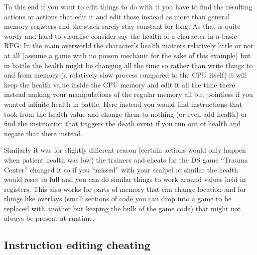 \documentclass[
]{book}
\begin{document}
To this end if you want to edit things to do with it you have to find the resulting actions or actions that edit it and edit those instead as more than general memory registers and the stack rarely stay constant for long. As that is quite wordy and hard to visualise consider say the health of a character in a basic RPG: In the main overworld the character's health matters relatively little or not at all (assume a game with no poison mechanic for the sake of this example) but in battle the health might be changing all the time so rather than write things to and from memory (a relatively slow process compared to the CPU itself) it will keep the health value inside the CPU memory and edit it all the time there instead making your manipulations of the regular memory all but pointless if you wanted infinite health in battle. Here instead you would find instructions that took from the health value and change them to nothing (or even add health) or find the instruction that triggers the death event if you run out of health and negate that there instead.

Similarly it was for slightly different reason (certain actions would only happen when patient health was low) the trainers and cheats for the DS game ``Trauma Center'' changed it so if you ``missed'' with your scalpel or similar the health would reset to full and you can do similar things to work around values held in registers. This also works for parts of memory that can change location and for things like overlays (small sections of code you can drop into a game to be replaced with another but keeping the bulk of the game code) that might not always be present at runtime.

\hypertarget{instruction-editing-cheating}{%
\subsection{Instruction editing cheating}\label{instruction-editing-cheating}}
\end{document}
